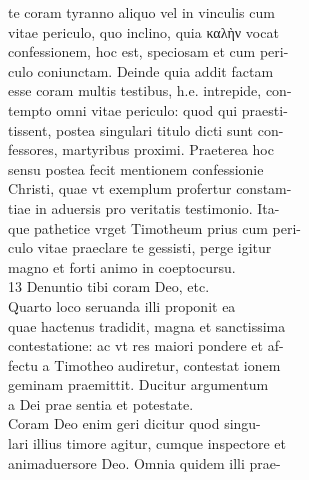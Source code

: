 \documentclass{article}
\begin{document}
\begin{pages}
                te coram tyranno aliquo vel in vinculis cum \\
                vitae periculo, quo inclino, quia καλὴν vocat \\
                confessionem, hoc est, speciosam et cum peri- \\
                culo coniunctam. Deinde quia addit factam \\
                esse coram multis testibus, h.e. intrepide, con- \\
                tempto omni vitae periculo: quod qui praesti- \\
                tissent, postea singulari titulo dicti sunt con- \\
                fessores, martyribus proximi. Praeterea hoc \\
                sensu postea fecit mentionem confessionie \\
                Christi, quae vt exemplum profertur constam- \\
                tiae in aduersis pro veritatis testimonio. Ita- \\
                que pathetice vrget Timotheum prius cum peri- \\
                culo vitae praeclare te gessisti, perge igitur \\
                magno et forti animo in coeptocursu. \\
                13 Denuntio tibi coram Deo, etc. \\
                Quarto loco seruanda illi proponit ea \\
                quae hactenus tradidit, magna et sanctissima \\
                contestatione: ac vt res maiori pondere et af- \\
                fectu a Timotheo audiretur, contestat ionem \\
                geminam praemittit. Ducitur argumentum \\
                a Dei prae sentia et potestate. \\
                Coram Deo enim geri dicitur quod singu- \\
                lari illius timore agitur, cumque inspectore et \\
                animaduersore Deo. Omnia quidem illi prae- \\

\end{pages}
\end{document}
